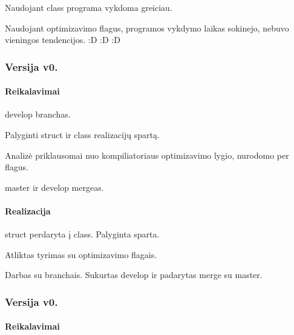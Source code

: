 \begin{DoxyItemize}
\item Naudojant class programa vykdoma greiciau.
\item Naudojant optimizavimo flag\textquotesingle{}us, programos vykdymo laikas sokinejo, nebuvo vieningos tendencijos. \+:D \+:D \+:D
\end{DoxyItemize}

\subsubsection*{Versija v0.}

\paragraph*{Reikalavimai}


\begin{DoxyEnumerate}
\item {\ttfamily develop} branch\textquotesingle{}as.
\item Palyginti {\ttfamily struct} ir {\ttfamily class} realizacijų spartą.
\item Analizė priklausomai nuo kompiliatoriaus optimizavimo lygio, nurodomo per flag\textquotesingle{}us.
\item {\ttfamily master} ir {\ttfamily develop} merge\textquotesingle{}as.
\end{DoxyEnumerate}

\paragraph*{Realizacija}


\begin{DoxyEnumerate}
\item {\ttfamily struct} perdaryta į {\ttfamily class}. Palyginta sparta.
\item Atliktas tyrimas su optimizavimo flag\textquotesingle{}ais.
\item Darbas su branch\textquotesingle{}ais. Sukurtas {\ttfamily develop} ir padarytas merge su {\ttfamily master}.
\end{DoxyEnumerate}

\subsubsection*{Versija v0.}

\paragraph*{Reikalavimai}


